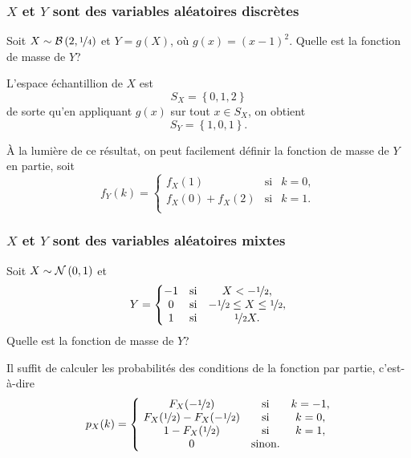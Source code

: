 \documentclass[11pt]{article}
\newcommand\Bin[2]{%
	\ensuremath{%
		\mathcal{B}\left(#1,#2\right)%
	}%
}%
\newcommand\Norm[2]{%
	\ensuremath{%
		\mathcal{N}\left(#1,#2\right)%
	}%
}%
\theoremstyle{remark}
\theoremstyle{definition}
\begin{document}
\subsubsection
	[$X$ et $Y$ sont des variables aléatoires discrètes]
	{\boldmath $X$ et $Y$ sont des variables aléatoires discrètes}
\begin{exemple}
	Soit $X\sim\Bin{2}{\nicefrac{1}{4}}$ et $Y=g(X)$, où $g(x)=(x-1)^2$. Quelle
	est la fonction de masse de $Y$?

	L'espace échantillion de $X$ est
	\begin{equation*}
		S_X=\left\{0,1,2\right\}
	\end{equation*}
	de sorte qu'en appliquant $g(x)$ sur tout $x\in S_X$, on obtient
	\begin{equation*}
		S_Y=\left\{1,0,1\right\}.
	\end{equation*}

	À la lumière de ce résultat, on peut facilement définir la fonction de
	masse de $Y$ en partie, soit
	\begin{equation*}
		f_Y(k)=\left\{
			\begin{matrix}
				f_X(1)        & \text{si} & k=0,\\
				f_X(0)+f_X(2) & \text{si} & k=1.\\
			\end{matrix}
		\right.
	\end{equation*}
\end{exemple}

\pagebreak
\subsubsection
	[$X$ et $Y$ sont des variables aléatoires mixtes]
	{\boldmath $X$ et $Y$ sont des variables aléatoires mixtes}
\begin{exemple}
	Soit $X\sim\Norm{0}{1}$ et
	\begin{equation*}
		Y=\left\{
			\begin{matrix}
				-1 &\text{si} & X<-\nicefrac{1}{2},\\
				 0 &\text{si} & -\nicefrac{1}{2}\leq X\leq\nicefrac{1}{2},\\
				 1 &\text{si} & \nicefrac{1}{2}X.\\
			\end{matrix}
		\right.
	\end{equation*}
	Quelle est la fonction de masse de $Y$?

	Il suffit de calculer les probabilités des conditions de la fonction par
	partie, c'est-à-dire
	\begin{equation*}
		p_X(k)=\left\{
	 		\begin{matrix}
				F_X(-\nicefrac{1}{2})                      & \text{si} &k=-1,\\
				F_X(\nicefrac{1}{2})-F_X(-\nicefrac{1}{2}) & \text{si} &k=0,\\
				1-F_X(\nicefrac{1}{2})                     & \text{si} &k=1,\\
				0                                          & \text{sinon}.\\
			\end{matrix}
		\right.
	\end{equation*}
\end{exemple}
\end{document}
